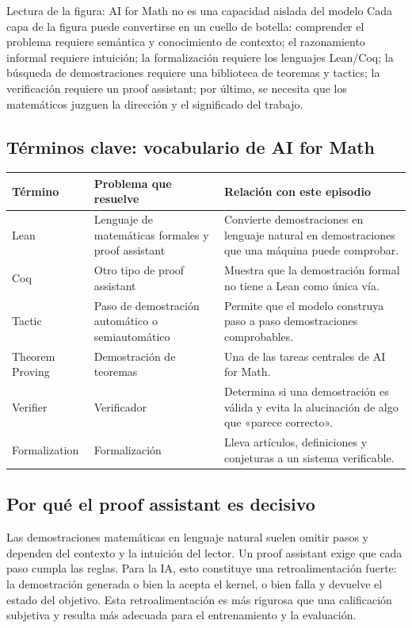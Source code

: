 \documentclass[a4paper]{article}
\begin{document}
\begin{knowledgebox}{Lectura de la figura: AI for Math no es una capacidad aislada del modelo}
Cada capa de la figura puede convertirse en un cuello de botella: comprender el problema requiere semántica y conocimiento de contexto; el razonamiento informal requiere intuición; la formalización requiere los lenguajes Lean/Coq; la búsqueda de demostraciones requiere una biblioteca de teoremas y tactics; la verificación requiere un proof assistant; por último, se necesita que los matemáticos juzguen la dirección y el significado del trabajo.
\end{knowledgebox}

\subsection{Términos clave: vocabulario de AI for Math}

\noindent\begin{tabularx}{\textwidth}{p{}p{}X}
\toprule
Término & Problema que resuelve & Relación con este episodio \\
\midrule
Lean & Lenguaje de matemáticas formales y proof assistant & Convierte demostraciones en lenguaje natural en demostraciones que una máquina puede comprobar. \\
Coq & Otro tipo de proof assistant & Muestra que la demostración formal no tiene a Lean como única vía. \\
Tactic & Paso de demostración automático o semiautomático & Permite que el modelo construya paso a paso demostraciones comprobables. \\
Theorem Proving & Demostración de teoremas & Una de las tareas centrales de AI for Math. \\
Verifier & Verificador & Determina si una demostración es válida y evita la alucinación de algo que «parece correcto». \\
Formalization & Formalización & Lleva artículos, definiciones y conjeturas a un sistema verificable. \\
\bottomrule
\end{tabularx}

\subsection{Por qué el proof assistant es decisivo}

Las demostraciones matemáticas en lenguaje natural suelen omitir pasos y dependen del contexto y la intuición del lector. Un proof assistant exige que cada paso cumpla las reglas. Para la IA, esto constituye una retroalimentación fuerte: la demostración generada o bien la acepta el kernel, o bien falla y devuelve el estado del objetivo. Esta retroalimentación es más rigurosa que una calificación subjetiva y resulta más adecuada para el entrenamiento y la evaluación.
\end{document}
